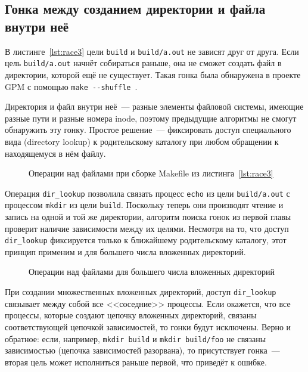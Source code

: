 \subsection{Гонка между созданием директории и файла внутри неё}
\label{subsec:dir-race}



В листинге~\ref{lst:race3} цели \texttt{build} и \texttt{build/a.out} не зависят друг от друга. Если цель \texttt{build/a.out} начнёт собираться раньше, она не сможет создать файл в директории, которой ещё не существует. Такая гонка была обнаружена в проекте GPM с помощью \texttt{make -{}-shuffle}~\cite{race-3-example}.

Директория и файл внутри неё~--- разные элементы файловой системы, имеющие разные пути и разные номера inode, поэтому предыдущие алгоритмы не смогут обнаружить эту гонку. Простое решение~--- фиксировать доступ специального вида (directory lookup) к родительскому каталогу при любом обращении к находящемуся в нём файлу.

\begin{figure}[H]
    \centering
    
    \caption{Операции над файлами при сборке Makefile из листинга~\ref{lst:race3}}
    \label{fig:dirlookup-demo}
\end{figure}

Операция \texttt{dir\_lookup} позволила связать процесс \texttt{echo} из цели \texttt{build/a.out} с процессом \texttt{mkdir} из цели \texttt{build}. Поскольку теперь они производят чтение и запись на одной и той же директории, алгоритм поиска гонок из первой главы проверит наличие зависимости между их целями. Несмотря на то, что доступ \texttt{dir\_lookup} фиксируется только к ближайшему родительскому каталогу, этот принцип применим и для большего числа вложенных директорий.

\begin{figure}[H]
    \centering
    
    \caption{Операции над файлами для большего числа вложенных директорий}
    \label{fig:dirlookup-demo-deep}
\end{figure}

При создании множественных вложенных директорий, доступ \texttt{dir\_lookup} связывает между собой все <<соседние>> процессы. Если окажется, что все процессы, которые создают цепочку вложенных директорий, связаны соответствующей цепочкой зависимостей, то гонки будут исключены. Верно и обратное: если, например, \texttt{mkdir build} и \texttt{mkdir build/foo} не связаны зависимостью (цепочка зависимостей разорвана), то присутствует гонка~--- вторая цель может исполниться раньше первой, что приведёт к ошибке.

